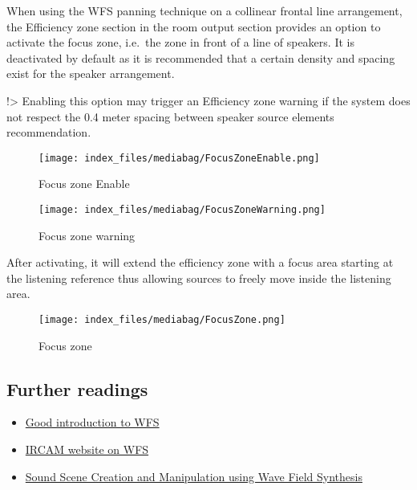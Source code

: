 \documentclass[
  letterpaper,
  DIV=11,
  numbers=noendperiod]{scrreport}
\begin{document}
When using the WFS panning technique on a collinear frontal line
arrangement, the Efficiency zone section in the room output section
provides an option to activate the focus zone, i.e.~the zone in front of
a line of speakers. It is deactivated by default as it is recommended
that a certain density and spacing exist for the speaker arrangement.

!\textgreater{} Enabling this option may trigger an Efficiency zone
warning if the system does not respect the 0.4 meter spacing between
speaker source elements recommendation.

\begin{figure}

{\centering \texttt{[image: index\_files/mediabag/FocusZoneEnable.png]}

}

\caption{Focus zone Enable}

\end{figure}

\begin{figure}

{\centering \texttt{[image: index\_files/mediabag/FocusZoneWarning.png]}

}

\caption{Focus zone warning}

\end{figure}

After activating, it will extend the efficiency zone with a focus area
starting at the listening reference thus allowing sources to freely move
inside the listening area.

\begin{figure}

{\centering \texttt{[image: index\_files/mediabag/FocusZone.png]}

}

\caption{Focus zone}

\end{figure}

\hypertarget{further-readings}{%
\subsection{Further readings}\label{further-readings}}

\begin{itemize}
\item
  \href{http://www.syntheticwave.de/Wavefieldsynthesis.htm}{Good
  introduction to WFS}
\item
  \href{http://recherche.ircam.fr/equipes/salles/WFS_WEBSITE/Index_wfs_site.htm}{IRCAM
  website on WFS}
\item
  \href{http://recherche.ircam.fr/equipes/salles/WFS_WEBSITE/Documents/WFS_overview.pdf}{Sound
  Scene Creation and Manipulation using Wave Field Synthesis}
\end{itemize}
\end{document}
